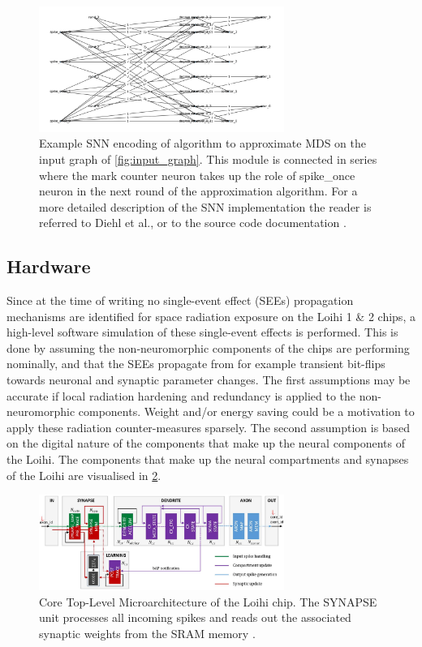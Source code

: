 \begin{figure}[H]
    \centering
    \includegraphics[width=8cm]{latex/Images/structured_graph.png}
    \caption{Example SNN encoding of algorithm to approximate MDS on the input graph of \cref{fig:input_graph}. This module is connected in series where the mark counter neuron takes up the role of spike\_once neuron in the next round of the approximation algorithm. For a more detailed description of the SNN implementation the reader is referred to Diehl et al., or to the source code documentation \cite{}. %
    }
    \label{fig:encoded_snn}
\end{figure}

\subsection{Hardware}\label{subsec:hardware}
Since at the time of writing no single-event effect (SEEs) propagation mechanisms are identified for space radiation exposure on the Loihi 1 \& 2 chips, a high-level software simulation of these single-event effects is performed. This is done by assuming the non-neuromorphic components of the chips are performing nominally, and that the SEEs propagate from for example transient bit-flips towards neuronal and synaptic parameter changes. The first assumptions may be accurate if local radiation hardening and redundancy is applied to the non-neuromorphic components. Weight and/or energy saving could be a motivation to apply these radiation counter-measures sparsely. The second assumption is based on the digital nature of the components that make up the neural components of the Loihi. The components that make up the neural compartments and synapses of the Loihi are visualised in \cref{fig:loihi_micro_architecture}.
\begin{figure}[H]
    \centering
    \includegraphics[width=8cm]{latex/Images/loihi_micro_architecture.png}
    \caption{Core Top-Level Microarchitecture of the Loihi chip. The SYNAPSE unit processes all incoming spikes and
    reads out the associated synaptic weights from the SRAM memory \cite{}%
    .}
    \label{fig:loihi_micro_architecture}
\end{figure}

